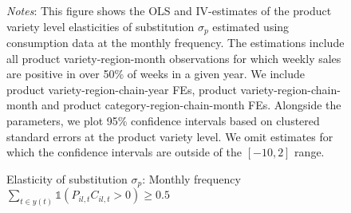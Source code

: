     \begin{figure}[H]
        \centering
        \caption{Elasticity of substitution $\sigma_p$: Monthly frequency $\sum_{t \in y(t)} \mathbb{1}(P_{il,t}C_{il,t} > 0) \geq 0.5$}
        \label{fig: app_elas_sigma_cats_monthly_50ptt}
        
         \parbox{\textwidth}{
            \begin{spacing}{1} 
                {\footnotesize 
                \textit{Notes}: This figure shows the OLS and IV-estimates of the product variety level elasticities of substitution $\sigma_p$ estimated using consumption data at the monthly frequency. The estimations include all product variety-region-month observations for which weekly sales are positive in over 50\% of weeks in a given year. We include product variety-region-chain-year FEs, product variety-region-chain-month and product category-region-chain-month FEs. Alongside the parameters, we plot 95\% confidence intervals based on clustered standard errors at the product variety level. We omit estimates for which the confidence intervals are outside of the $[-10,2]$ range.}
            \end{spacing}}
     \end{figure} 

